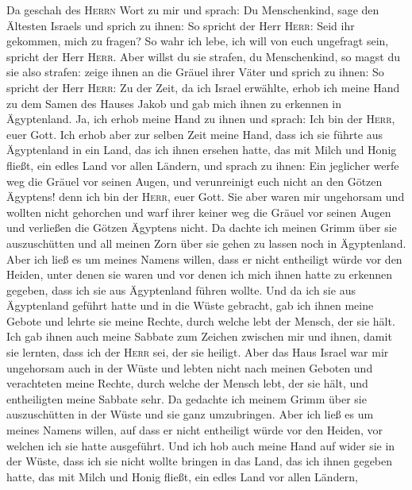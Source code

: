 Da geschah des \textsc{Herrn} Wort zu mir und sprach:
 Du Menschenkind, sage den Ältesten Israels und sprich zu
ihnen: So spricht der Herr \textsc{Herr}: Seid ihr gekommen, mich zu
fragen? So wahr ich lebe, ich will von euch ungefragt sein, spricht der
Herr \textsc{Herr}.  Aber willst du sie strafen, du
Menschenkind, so magst du sie also strafen: zeige ihnen an die Gräuel
ihrer Väter  und sprich zu ihnen: So spricht der Herr
\textsc{Herr}: Zu der Zeit, da ich Israel erwählte, erhob ich meine Hand
zu dem Samen des Hauses Jakob und gab mich ihnen zu erkennen in
Ägyptenland. Ja, ich erhob meine Hand zu ihnen und sprach: Ich bin der
\textsc{Herr}, euer Gott.  Ich erhob aber zur selben Zeit
meine Hand, dass ich sie führte aus Ägyptenland in ein Land, das ich
ihnen ersehen hatte, das mit Milch und Honig fließt, ein edles Land vor
allen Ländern,  und sprach zu ihnen: Ein jeglicher werfe
weg die Gräuel vor seinen Augen, und verunreinigt euch nicht an den
Götzen Ägyptens! denn ich bin der \textsc{Herr}, euer Gott.
 Sie aber waren mir ungehorsam und wollten nicht gehorchen
und warf ihrer keiner weg die Gräuel vor seinen Augen und verließen die
Götzen Ägyptens nicht. Da dachte ich meinen Grimm über sie auszuschütten
und all meinen Zorn über sie gehen zu lassen noch in Ägyptenland.
 Aber ich ließ es um meines Namens willen, dass er nicht
entheiligt würde vor den Heiden, unter denen sie waren und vor denen ich
mich ihnen hatte zu erkennen gegeben, dass ich sie aus Ägyptenland
führen wollte.  Und da ich sie aus Ägyptenland geführt
hatte und in die Wüste gebracht,  gab ich ihnen meine
Gebote und lehrte sie meine Rechte, durch welche lebt der Mensch, der
sie hält.  Ich gab ihnen auch meine Sabbate zum Zeichen
zwischen mir und ihnen, damit sie lernten, dass ich der \textsc{Herr}
sei, der sie heiligt.  Aber das Haus Israel war mir
ungehorsam auch in der Wüste und lebten nicht nach meinen Geboten und
verachteten meine Rechte, durch welche der Mensch lebt, der sie hält,
und entheiligten meine Sabbate sehr. Da gedachte ich meinem Grimm über
sie auszuschütten in der Wüste und sie ganz umzubringen. 
Aber ich ließ es um meines Namens willen, auf dass er nicht entheiligt
würde vor den Heiden, vor welchen ich sie hatte ausgeführt.
 Und ich hob auch meine Hand auf wider sie in der Wüste,
dass ich sie nicht wollte bringen in das Land, das ich ihnen gegeben
hatte, das mit Milch und Honig fließt, ein edles Land vor allen Ländern,
